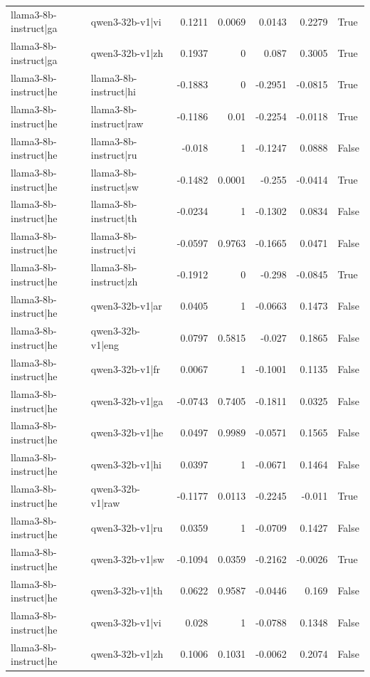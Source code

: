 \begin{table}
\begin{tabular}{l l r r r r l}
llama3-8b-instruct|ga & qwen3-32b-v1|vi & 0.1211 & 0.0069 & 0.0143 & 0.2279 & True \\
llama3-8b-instruct|ga & qwen3-32b-v1|zh & 0.1937 & 0 & 0.087 & 0.3005 & True \\
llama3-8b-instruct|he & llama3-8b-instruct|hi & -0.1883 & 0 & -0.2951 & -0.0815 & True \\
llama3-8b-instruct|he & llama3-8b-instruct|raw & -0.1186 & 0.01 & -0.2254 & -0.0118 & True \\
llama3-8b-instruct|he & llama3-8b-instruct|ru & -0.018 & 1 & -0.1247 & 0.0888 & False \\
llama3-8b-instruct|he & llama3-8b-instruct|sw & -0.1482 & 0.0001 & -0.255 & -0.0414 & True \\
llama3-8b-instruct|he & llama3-8b-instruct|th & -0.0234 & 1 & -0.1302 & 0.0834 & False \\
llama3-8b-instruct|he & llama3-8b-instruct|vi & -0.0597 & 0.9763 & -0.1665 & 0.0471 & False \\
llama3-8b-instruct|he & llama3-8b-instruct|zh & -0.1912 & 0 & -0.298 & -0.0845 & True \\
llama3-8b-instruct|he & qwen3-32b-v1|ar & 0.0405 & 1 & -0.0663 & 0.1473 & False \\
llama3-8b-instruct|he & qwen3-32b-v1|eng & 0.0797 & 0.5815 & -0.027 & 0.1865 & False \\
llama3-8b-instruct|he & qwen3-32b-v1|fr & 0.0067 & 1 & -0.1001 & 0.1135 & False \\
llama3-8b-instruct|he & qwen3-32b-v1|ga & -0.0743 & 0.7405 & -0.1811 & 0.0325 & False \\
llama3-8b-instruct|he & qwen3-32b-v1|he & 0.0497 & 0.9989 & -0.0571 & 0.1565 & False \\
llama3-8b-instruct|he & qwen3-32b-v1|hi & 0.0397 & 1 & -0.0671 & 0.1464 & False \\
llama3-8b-instruct|he & qwen3-32b-v1|raw & -0.1177 & 0.0113 & -0.2245 & -0.011 & True \\
llama3-8b-instruct|he & qwen3-32b-v1|ru & 0.0359 & 1 & -0.0709 & 0.1427 & False \\
llama3-8b-instruct|he & qwen3-32b-v1|sw & -0.1094 & 0.0359 & -0.2162 & -0.0026 & True \\
llama3-8b-instruct|he & qwen3-32b-v1|th & 0.0622 & 0.9587 & -0.0446 & 0.169 & False \\
llama3-8b-instruct|he & qwen3-32b-v1|vi & 0.028 & 1 & -0.0788 & 0.1348 & False \\
llama3-8b-instruct|he & qwen3-32b-v1|zh & 0.1006 & 0.1031 & -0.0062 & 0.2074 & False \\

\end{tabular}
\end{table}
